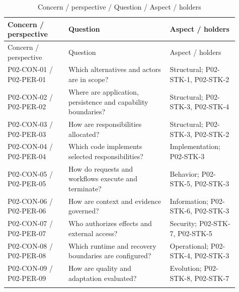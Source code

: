 \documentclass[10pt,letterpaper]{article}
\begin{document}
\begin{longtable}{@{}>{\raggedright\arraybackslash}p{0.24\linewidth}>{\raggedright\arraybackslash}p{0.4\linewidth}>{\raggedright\arraybackslash}p{0.27\linewidth}@{}}
\caption{Concern / perspective / Question / Aspect / holders}\\
\toprule Concern / perspective & Question & Aspect / holders\\\midrule\endfirsthead
\toprule Concern / perspective & Question & Aspect / holders\\\midrule\endhead
P02-CON-01 / P02-PER-01 & Which alternatives and actors are in scope? & Structural; P02-STK-1, P02-STK-2\\\addlinespace
P02-CON-02 / P02-PER-02 & Where are application, persistence and capability boundaries? & Structural; P02-STK-3, P02-STK-4\\\addlinespace
P02-CON-03 / P02-PER-03 & How are responsibilities allocated? & Structural; P02-STK-3, P02-STK-2\\\addlinespace
P02-CON-04 / P02-PER-04 & Which code implements selected responsibilities? & Implementation; P02-STK-3\\\addlinespace
P02-CON-05 / P02-PER-05 & How do requests and workflows execute and terminate? & Behavior; P02-STK-5, P02-STK-3\\\addlinespace
P02-CON-06 / P02-PER-06 & How are context and evidence governed? & Information; P02-STK-6, P02-STK-3\\\addlinespace
P02-CON-07 / P02-PER-07 & Who authorizes effects and external access? & Security; P02-STK-7, P02-STK-5\\\addlinespace
P02-CON-08 / P02-PER-08 & Which runtime and recovery boundaries are configured? & Operational; P02-STK-4, P02-STK-3\\\addlinespace
P02-CON-09 / P02-PER-09 & How are quality and adaptation evaluated? & Evolution; P02-STK-8, P02-STK-7\\\addlinespace
\bottomrule\end{longtable}
\end{document}
